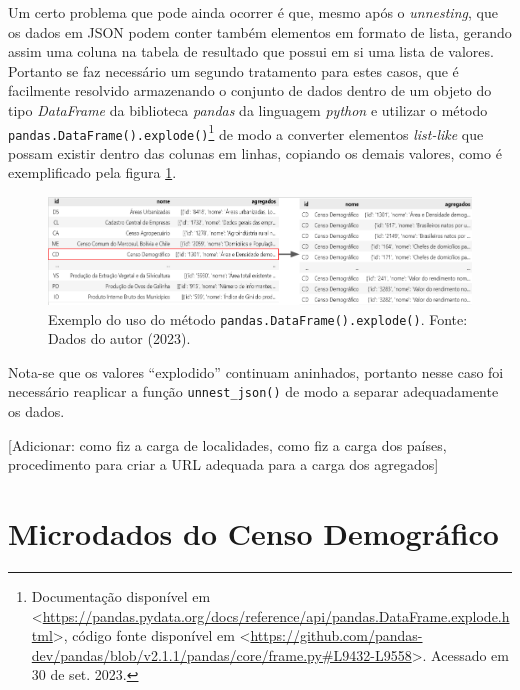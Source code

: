     Um certo problema que pode ainda ocorrer é que, mesmo após o \textit{unnesting}, que os dados em JSON podem conter também elementos em formato de lista, gerando assim uma coluna na tabela de resultado que possui em si uma lista de valores. Portanto se faz necessário um segundo tratamento para estes casos, que é facilmente resolvido armazenando o conjunto de dados dentro de um objeto do tipo \textit{DataFrame} da biblioteca \textit{pandas} da linguagem \textit{python} e utilizar o método \lstinline{pandas.DataFrame().explode()}\footnote{Documentação disponível em <\url{https://pandas.pydata.org/docs/reference/api/pandas.DataFrame.explode.html}>, código fonte disponível em <\url{https://github.com/pandas-dev/pandas/blob/v2.1.1/pandas/core/frame.py\#L9432-L9558}>. Acessado em 30 de set. 2023.}     de modo a converter elementos \textit{list-like} que possam existir dentro das colunas em linhas, copiando os demais valores, como é exemplificado pela figura \ref{fig:exploding-df}.

\begin{figure}[h]
    \centering
    \includegraphics[width=\textwidth]{files/img/exploding_table.png}    \caption{Exemplo do uso do método \lstinline{pandas.DataFrame().explode()}. Fonte: Dados do autor (2023).}
    \label{fig:exploding-df}
\end{figure}

    Nota-se que os valores ``explodido'' continuam aninhados, portanto nesse caso foi necessário reaplicar a função \lstinline{unnest_json()} de modo a separar adequadamente os dados.

    [Adicionar: como fiz a carga de localidades, como fiz a carga dos países, procedimento para criar a URL adequada para a carga dos agregados]



\section{Microdados do Censo Demográfico}

